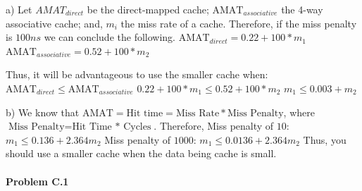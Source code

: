 \documentclass[11pt]{article}
\begin{document}
\begin{flushleft}
    a) Let $AMAT_{direct}$ be the direct-mapped cache; $\text{AMAT}_{associative}$ the 4-way associative cache; and, $m_i$ the miss rate of a cache. Therefore, if the miss penalty is $100ns$ we can conclude the following.
    \newline
    $\text{AMAT}_{direct} = 0.22 + 100 *m_1$
    \newline
    $\text{AMAT}_{associative} = 0.52 + 100*m_2$
    \newline

    Thus, it will be advantageous to use the smaller cache when:
    \newline
    $\text{AMAT}_{direct} \leq \text{AMAT}_{associative}$
    \newline
    $0.22 + 100 *m_1 \leq  0.52 + 100*m_2$
    \newline
    $m_1 \leq 0.003 + m_2$
    \newline

    b) We know that $\text{AMAT} = \text{Hit time} = \text{Miss Rate} * \text{Miss Penalty}$, where $\text{Miss Penalty} = \text{Hit Time * Cycles}$. Therefore,
    \newline
    Miss penalty of $10$: $m_1 \leq 0.136 + 2.364m_2$
    \newline
    Miss penalty of $1000$: $m_1 \leq 0.0136 + 2.364m_2$
    \newline
    \newline
    Thus, you should use a smaller cache when the data being cache is small.
\end{flushleft}   


\paragraph{\noindent\textbf{\LARGE{Problem C.1}}}

\end{document}
